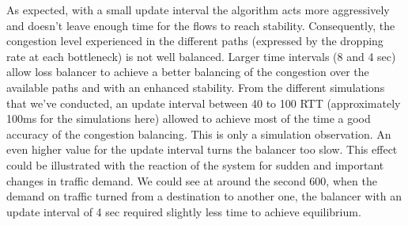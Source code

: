 As expected, with a small update interval the algorithm acts more aggressively and doesn't leave enough time for the flows to reach stability. Consequently,  the congestion level experienced in the different paths (expressed by the dropping rate at each bottleneck) is not well balanced. Larger time intervals (8 and 4 sec) allow loss balancer to achieve a better balancing of the congestion over the available paths and with an enhanced stability. From the different simulations that we've conducted, an update interval between 40 to 100 RTT (approximately 100ms for the simulations here) allowed to achieve most of the time a good accuracy of the congestion balancing. This is only a simulation observation. An even higher value for the update interval turns the balancer too slow. This effect could be illustrated with the reaction of the system for sudden and important changes in traffic demand. We could see at around the second 600, when the demand on traffic turned from a destination to another one, the balancer with an update interval of 4 sec required slightly less time to achieve equilibrium.    

\clearpage


